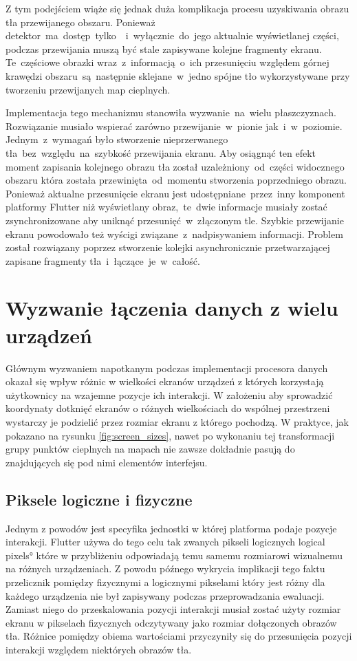 Z tym podejściem wiąże się jednak duża komplikacja procesu uzyskiwania obrazu tła przewijanego obszaru. Ponieważ detektor~ma~dostęp~tylko~~i~wyłącznie~do~jego aktualnie wyświetlanej części, podczas przewijania muszą być stale zapisywane kolejne fragmenty ekranu. Te~częściowe obrazki wraz~z~informacją~o~ich przesunięciu względem górnej krawędzi obszaru~są~następnie sklejane~w~jedno spójne tło wykorzystywane przy tworzeniu przewijanych map cieplnych.

Implementacja tego mechanizmu stanowiła wyzwanie~na~wielu płaszczyznach. Rozwiązanie musiało wspierać zarówno przewijanie~w~pionie jak~i~w~poziomie. Jednym~z~wymagań było stworzenie nieprzerwanego tła~bez~względu~na~szybkość przewijania ekranu. Aby osiągnąć ten efekt moment zapisania kolejnego obrazu tła został uzależniony~od~części widocznego obszaru która została przewinięta~od~momentu stworzenia poprzedniego obrazu. Ponieważ aktualne przesunięcie ekranu jest udostępniane~przez~inny komponent platformy Flutter niż wyświetlany obraz,~te~dwie informacje musiały zostać zsynchronizowane aby uniknąć przesunięć~w~złączonym tle. Szybkie przewijanie ekranu powodowało też wyścigi związane~z~nadpisywaniem informacji. Problem został rozwiązany poprzez stworzenie kolejki asynchronicznie przetwarzającej zapisane fragmenty tła~i~łączące~je~w~całość.

\section{Wyzwanie łączenia danych z wielu urządzeń}
Głównym wyzwaniem napotkanym podczas implementacji procesora danych okazał się wpływ różnic w wielkości ekranów urządzeń z których korzystają użytkownicy na wzajemne pozycje ich interakcji. W założeniu aby sprowadzić koordynaty dotknięć ekranów o różnych wielkościach do wspólnej przestrzeni wystarczy je podzielić przez rozmiar ekranu z którego pochodzą. W praktyce, jak pokazano na rysunku \ref{fig:screen_sizes}, nawet po wykonaniu tej transformacji grupy punktów cieplnych na mapach nie zawsze dokładnie pasują do znajdujących się pod nimi elementów interfejsu. 

\subsection{Piksele logiczne i fizyczne}
Jednym z powodów jest specyfika jednostki w której platforma podaje pozycje interakcji. Flutter używa do tego celu tak zwanych pikseli logicznych \ang{logical pixels} które w przybliżeniu odpowiadają temu samemu rozmiarowi wizualnemu na różnych urządzeniach. Z powodu późnego wykrycia implikacji tego faktu przelicznik pomiędzy fizycznymi a logicznymi pikselami który jest różny dla każdego urządzenia nie był zapisywany podczas przeprowadzania ewaluacji. Zamiast niego do przeskalowania pozycji interakcji musiał zostać użyty rozmiar ekranu w pikselach fizycznych odczytywany jako rozmiar dołączonych obrazów tła. Różnice pomiędzy obiema wartościami przyczyniły się do przesunięcia pozycji interakcji względem niektórych obrazów tła.

